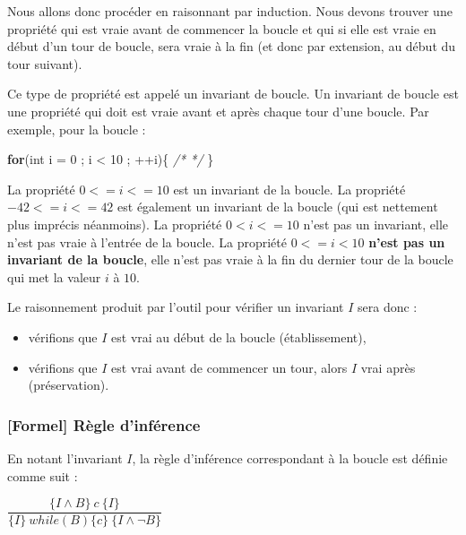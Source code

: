 \documentclass[12pt,francais,]{scrbook}
\newenvironment{Shaded}{}{}
\newcommand{\KeywordTok}[1]{\textcolor[rgb]{0.00,0.44,0.13}{\textbf{{#1}}}}
\newcommand{\DataTypeTok}[1]{\textcolor[rgb]{0.56,0.13,0.00}{{#1}}}
\newcommand{\DecValTok}[1]{\textcolor[rgb]{0.25,0.63,0.44}{{#1}}}
\newcommand{\CommentTok}[1]{\textcolor[rgb]{0.38,0.63,0.69}{\textit{{#1}}}}
\newcommand{\NormalTok}[1]{{#1}}
\providecommand{\tightlist}{%
  \setlength{\itemsep}{0pt}\setlength{\parskip}{0pt}}
\begin{document}
Nous allons donc procéder en raisonnant par induction. Nous devons
trouver une propriété qui est vraie avant de commencer la boucle et qui
si elle est vraie en début d'un tour de boucle, sera vraie à la fin (et
donc par extension, au début du tour suivant).

Ce type de propriété est appelé un invariant de boucle. Un invariant de
boucle est une propriété qui doit est vraie avant et après chaque tour
d'une boucle. Par exemple, pour la boucle :

\begin{footnotesize}\begin{Shaded}
\begin{Highlighting}[]
\KeywordTok{for}\NormalTok{(}\DataTypeTok{int} \NormalTok{i = }\DecValTok{0} \NormalTok{; i < }\DecValTok{10} \NormalTok{; ++i)\{ }\CommentTok{/* */} \NormalTok{\}}
\end{Highlighting}
\end{Shaded}\end{footnotesize}

La propriété \(0 <= i <= 10\) est un invariant de la boucle. La
propriété \(-42 <= i <= 42\) est également un invariant de la boucle
(qui est nettement plus imprécis néanmoins). La propriété
\(0 < i <= 10\) n'est pas un invariant, elle n'est pas vraie à l'entrée
de la boucle. La propriété \(0 <= i < 10\) \textbf{n'est pas un
invariant de la boucle}, elle n'est pas vraie à la fin du dernier tour
de la boucle qui met la valeur \(i\) à \(10\).

Le raisonnement produit par l'outil pour vérifier un invariant \(I\)
sera donc :

\begin{itemize}
\tightlist
\item
  vérifions que \(I\) est vrai au début de la boucle (établissement),
\item
  vérifions que \(I\) est vrai avant de commencer un tour, alors \(I\)
  vrai après (préservation).
\end{itemize}

\subsubsection{{[}Formel{]} Règle
d'inférence}\label{formel-ruxe8gle-dinfuxe9rence}

En notant l'invariant \(I\), la règle d'inférence correspondant à la
boucle est définie comme suit :

\begin{center}
\(\dfrac{\{I \wedge B \}\ c\ \{I\}}{\{I\}\ while(B)\{c\}\ \{I \wedge \neg B\}}\)
\end{center}
\end{document}
